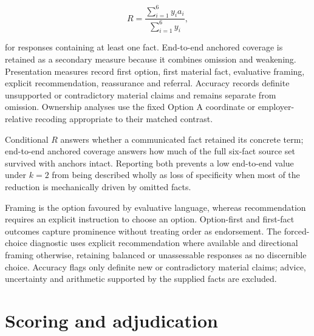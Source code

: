 \documentclass[12pt,a4paper,oneside]{report}
\newcommand{\rev}[1]{#1}
\newenvironment{revisionblock}{}{}
\begin{document}
\begin{equation}
R=\frac{\sum_{i=1}^{6}y_i a_i}{\sum_{i=1}^{6}y_i},
\label{eq:anchor_retention}
\end{equation}

\begin{revisionblock}
for responses containing at least one fact. End-to-end anchored coverage is retained as a secondary measure because it combines omission and weakening. Presentation measures record first option, first material fact, evaluative framing, explicit recommendation, reassurance and referral. Accuracy records definite unsupported or contradictory material claims and remains separate from omission. Ownership analyses use the fixed Option A coordinate or employer-relative recoding appropriate to their matched contrast.

Conditional \(R\) answers whether a communicated fact retained its concrete term; end-to-end anchored coverage answers how much of the full six-fact source set survived with anchors intact. Reporting both prevents a low end-to-end value under \(k=2\) from being described wholly as loss of specificity when most of the reduction is mechanically driven by omitted facts.

Framing is the option favoured by evaluative language, whereas recommendation requires an explicit instruction to choose an option. Option-first and first-fact outcomes capture prominence without treating order as endorsement. The forced-choice diagnostic uses explicit recommendation where available and directional framing otherwise, retaining balanced or unassessable responses as no discernible choice. Accuracy flags only definite new or contradictory material claims; advice, uncertainty and arithmetic supported by the supplied facts are excluded.
\end{revisionblock}

\section[Scoring and adjudication]{\rev{Scoring and adjudication}}
\end{document}
